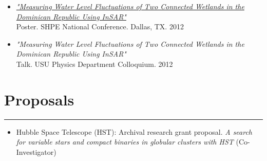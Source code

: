 \documentclass[letterpaper,10pt]{article}
\begin{document}
\begin{itemize}[label=$\blacktriangleright$]


\item \textit{\href{http://manuelpm.me/papers/posterinsar.pdf}{"Measuring Water Level Fluctuations of Two Connected Wetlands in the Dominican Republic Using InSAR"}} \\Poster. SHPE National Conference. Dallas, TX. 2012

\item \emph{"Measuring Water Level Fluctuations of Two Connected Wetlands in the Dominican Republic Using InSAR"}\\
Talk. USU Physics Department Colloquium. 2012
\end{itemize}
\begin{comment}
\subsection*{Media Coverage}

\begin{itemize}[label=$\blacktriangleright$]

\item \hyperref[https://phys.org/news/2017-03-planetary-earth-sun.html]{Planetary waves, first found on Earth, are discovered on Sun (phys.org)}

\end{itemize}
\end{comment}
\section*{Proposals}       

\hrule
\vspace{.3 cm}


  \begin{itemize}[label=$\blacktriangleright$]
      \item Hubble Space Telescope (HST):  Archival research grant proposal. \emph{A search for variable stars and compact binaries in globular clusters with HST } (Co-Investigator)
  \end{itemize}
  
\end{document}
